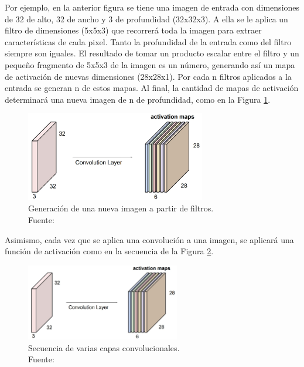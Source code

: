 \begin{itemize}
\begin{itemize}
\begin{itemize}
			Por ejemplo, en la anterior figura se tiene una imagen de entrada con dimensiones de 32 de alto, 32 de ancho y 3 de profundidad (32x32x3). A ella se le aplica un filtro de dimensiones (5x5x3) que recorrerá toda la imagen para extraer características de cada pixel. Tanto la profundidad de la entrada como del filtro siempre son iguales. El resultado de tomar un producto escalar entre el filtro y un pequeño fragmento de 5x5x3 de la imagen es un número, generando así un mapa de activación de nuevas dimensiones (28x28x1). Por cada n filtros aplicados a la entrada se generan n de estos mapas. Al final, la cantidad de mapas de activación determinará una nueva imagen de n de profundidad, como en la Figura \ref{2:fig26}.
			\begin{figure}[h]
				\begin{center}
					\includegraphics[width=0.7\textwidth]{2/figures/filtros_cnn.jpg}
					\caption[Generación de una nueva imagen a partir de filtros]{Generación de una nueva imagen a partir de filtros.\\
					Fuente: \cite{tec_li2019cnn}}
					\label{2:fig26}
				\end{center}
			\end{figure}
			
			Asimismo, cada vez que se aplica una convolución a una imagen, se aplicará una función de activación como en la secuencia de la Figura \ref{2:fig27}.
			\begin{figure}[h]
				\begin{center}
					\includegraphics[width=0.60\textwidth]{2/figures/filtros_cnn.jpg}
					\caption[Secuencia de varias capas convolucionales]{Secuencia de varias capas convolucionales.\\
					Fuente: \cite{tec_li2019cnn}}
					\label{2:fig27}
				\end{center}
			\end{figure}
			

\end{itemize}
\end{itemize}
\end{itemize}
